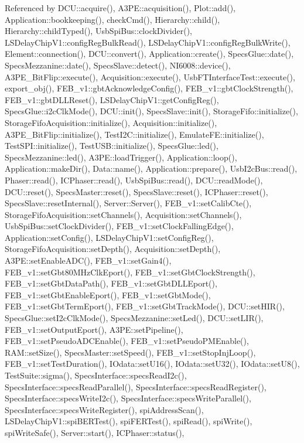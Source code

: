 Referenced by D\+C\+U\+::acquire(), A3\+P\+E\+::acquisition(), Plot\+::add(), Application\+::bookkeeping(), check\+Cmd(), Hierarchy\+::child(), Hierarchy\+::child\+Typed(), Usb\+Spi\+Bus\+::clock\+Divider(), L\+S\+Delay\+Chip\+V1\+::config\+Reg\+Bulk\+Read(), L\+S\+Delay\+Chip\+V1\+::config\+Reg\+Bulk\+Write(), Element\+::connection(), D\+C\+U\+::convert(), Application\+::create(), Specs\+Glue\+::date(), Specs\+Mezzanine\+::date(), Specs\+Slave\+::detect(), N\+I6008\+::device(), A3\+P\+E\+\_\+\+Bit\+Flip\+::execute(), Acquisition\+::execute(), Usb\+F\+T\+Interface\+Test\+::execute(), export\+\_\+obj(), F\+E\+B\+\_\+v1\+::gbt\+Acknowledge\+Config(), F\+E\+B\+\_\+v1\+::gbt\+Clock\+Strength(), F\+E\+B\+\_\+v1\+::gbt\+D\+L\+L\+Reset(), L\+S\+Delay\+Chip\+V1\+::get\+Config\+Reg(), Specs\+Glue\+::i2c\+Clk\+Mode(), D\+C\+U\+::init(), Specs\+Slave\+::init(), Storage\+Fifo\+::initialize(), Storage\+Fifo\+Acquisition\+::initialize(), Acquisition\+::initialize(), A3\+P\+E\+\_\+\+Bit\+Flip\+::initialize(), Test\+I2\+C\+::initialize(), Emulate\+F\+E\+::initialize(), Test\+S\+P\+I\+::initialize(), Test\+U\+S\+B\+::initialize(), Specs\+Glue\+::led(), Specs\+Mezzanine\+::led(), A3\+P\+E\+::load\+Trigger(), Application\+::loop(), Application\+::make\+Dir(), Data\+::name(), Application\+::prepare(), Usb\+I2c\+Bus\+::read(), Phaser\+::read(), I\+C\+Phaser\+::read(), Usb\+Spi\+Bus\+::read(), D\+C\+U\+::read\+Mode(), D\+C\+U\+::reset(), Specs\+Master\+::reset(), Specs\+Slave\+::reset(), I\+C\+Phaser\+::reset(), Specs\+Slave\+::reset\+Internal(), Server\+::\+Server(), F\+E\+B\+\_\+v1\+::set\+Calib\+Cte(), Storage\+Fifo\+Acquisition\+::set\+Channels(), Acquisition\+::set\+Channels(), Usb\+Spi\+Bus\+::set\+Clock\+Divider(), F\+E\+B\+\_\+v1\+::set\+Clock\+Falling\+Edge(), Application\+::set\+Config(), L\+S\+Delay\+Chip\+V1\+::set\+Config\+Reg(), Storage\+Fifo\+Acquisition\+::set\+Depth(), Acquisition\+::set\+Depth(), A3\+P\+E\+::set\+Enable\+A\+D\+C(), F\+E\+B\+\_\+v1\+::set\+Gain4(), F\+E\+B\+\_\+v1\+::set\+Gbt80\+M\+Hz\+Clk\+Eport(), F\+E\+B\+\_\+v1\+::set\+Gbt\+Clock\+Strength(), F\+E\+B\+\_\+v1\+::set\+Gbt\+Data\+Path(), F\+E\+B\+\_\+v1\+::set\+Gbt\+D\+L\+L\+Eport(), F\+E\+B\+\_\+v1\+::set\+Gbt\+Enable\+Eport(), F\+E\+B\+\_\+v1\+::set\+Gbt\+Mode(), F\+E\+B\+\_\+v1\+::set\+Gbt\+Term\+Eport(), F\+E\+B\+\_\+v1\+::set\+Gbt\+Track\+Mode(), D\+C\+U\+::set\+H\+I\+R(), Specs\+Glue\+::set\+I2c\+Clk\+Mode(), Specs\+Mezzanine\+::set\+Led(), D\+C\+U\+::set\+L\+I\+R(), F\+E\+B\+\_\+v1\+::set\+Output\+Eport(), A3\+P\+E\+::set\+Pipeline(), F\+E\+B\+\_\+v1\+::set\+Pseudo\+A\+D\+C\+Enable(), F\+E\+B\+\_\+v1\+::set\+Pseudo\+P\+M\+Enable(), R\+A\+M\+::set\+Size(), Specs\+Master\+::set\+Speed(), F\+E\+B\+\_\+v1\+::set\+Stop\+Inj\+Loop(), F\+E\+B\+\_\+v1\+::set\+Test\+Duration(), I\+Odata\+::set\+U16(), I\+Odata\+::set\+U32(), I\+Odata\+::set\+U8(), Test\+Suite\+::sigma(), Specs\+Interface\+::specs\+Read\+I2c(), Specs\+Interface\+::specs\+Read\+Parallel(), Specs\+Interface\+::specs\+Read\+Register(), Specs\+Interface\+::specs\+Write\+I2c(), Specs\+Interface\+::specs\+Write\+Parallel(), Specs\+Interface\+::specs\+Write\+Register(), spi\+Address\+Scan(), L\+S\+Delay\+Chip\+V1\+::spi\+B\+E\+R\+Test(), spi\+F\+E\+R\+Test(), spi\+Read(), spi\+Write(), spi\+Write\+Safe(), Server\+::start(), I\+C\+Phaser\+::status(), 